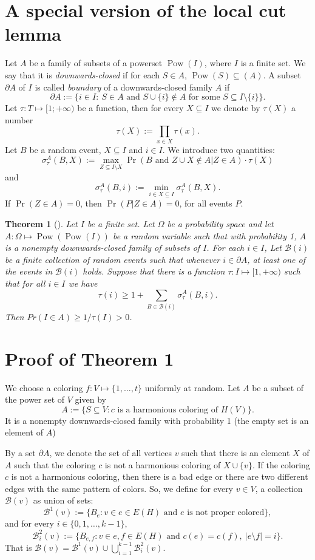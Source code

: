 \documentclass{article}
\newtheorem{theorem}{Theorem}
\DeclareMathOperator{\power}{Pow}
\begin{document}
	\section{A special version of the local cut lemma}
	Let $A$ be a family of subsets of a powerset $\power(I)$, where $I$ is a finite set. We say that it is \emph{downwards-closed} if for each $S\in A$, $\power(S)\subseteq(A)$. A subset $\partial A$ of $I$ is called \emph{boundary} of a downwards-closed family $A$ if 
	\[\partial A:=\{i\in I:\ S\in A \text{ and } S\cup \{i\}\not\in A \text{ for some }S\subseteq I\setminus\{i\}\}.\]
	Let $\tau\colon T\mapsto [1;+\infty)$ be a function, then for every $X\subseteq I$ we denote by $\tau(X)$ a number
	\[\tau(X):=\prod_{x\in X} \tau(x).\]
	Let $B$ be a random event, $X\subseteq I$ and $i\in I$. We introduce two quantities:
	\[\sigma^{A}_{\tau}(B,X):=\max_{Z\subseteq I\setminus X}\Pr(B \text{ and } Z\cup X \not\in A|Z\in A)\cdot\tau(X)\]
	and
	\[\sigma^{A}_{\tau}(B,i):=\min_{i\in X\subseteq I}\sigma^{A}_{\tau}(B,X).\]
        If $\Pr(Z\in A)=0$, then $\Pr(P|Z\in A)=0$, for all events $P$.
	\begin{theorem}[\cite{Bernshteyn}]\label{th:lcl}
		Let $I$ be a finite set. Let $\Omega$ be a probability space and let $A\colon\Omega\mapsto\power(\power(I))$ be a random variable such that with probability 1, $A$ is a nonempty downwards-closed family of subsets of $I$. For each $i\in I$, Let $\mathcal{B}(i)$ be a finite collection of random events such that whenever $i\in\partial A$, at least one of the events in $\mathcal{B}(i)$ holds. Suppose that there is a function $\tau\colon I\mapsto [1,+\infty)$ such that for all $i\in I$ we have 
		\[\tau(i)\geq1+\sum_{B\in \mathcal{B}(i)} \sigma^{A}_{\tau}(B,i).\]
		Then $Pr(I\in A)\geq1/\tau(I)>0$.
	\end{theorem}
	
	\section{Proof of Theorem 1}
	We choose a coloring $f:V\mapsto \{1,\ldots,t\}$ uniformly at random. Let $A$ be a subset of the power set of $V$ given by
	\[A:=\{S\subseteq V:c \text{ is a harmonious coloring of }H(V)\}.\]
	It is a nonempty downwards-closed family with probability 1 (the empty set is an element of $A$)
	
	By a set $\partial A$, we denote the set of all vertices $v$ such that there is an element $X$ of $A$ such that the coloring $c$ is not a harmonious coloring of $X\cup\{v\}$. If the coloring $c$ is not a harmonious coloring, then there is a bad edge or there are two different edges with the same pattern of colors. So, we define for every $v \in V$, a collection $\mathcal{B}(v)$ as union of sets: 
	\[\mathcal{B}^1(v):=\{B_e:v\in e\in E(H) \text{ and } e \text{ is not proper colored}\},\]
	and for every $i\in\{0,1,\ldots,k-1\}$,
	\[\mathcal{B}^2_i(v):=\{B_{e,f}:v\in e,f\in E(H) \text{ and } c(e)=c(f),\ |e\setminus f|=i\}.\]
	That is $\mathcal{B}(v)=\mathcal{B}^1(v)\cup \bigcup_{i=1}^{k-1}\mathcal{B}^2_i(v)$.
	
\end{document}
